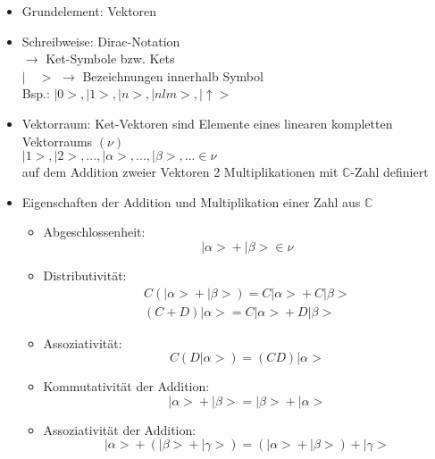 \documentclass[10pt,article,colorback,accentcolor=tud9d]{scrartcl}
\begin{document}
\begin{itemize}
\item Grundelement: Vektoren
\item Schreibweise: Dirac-Notation\\
$\rightarrow$ Ket-Symbole bzw. Kets\\
$\left| \quad > \right.$ $\rightarrow$ Bezeichnungen innerhalb Symbol\\
Bsp.: $\left| 0>\right.,\left|1>\right.,\left|n>\right.,\left|nlm>\right.,\left| \uparrow>\right.$
\item Vektorraum: Ket-Vektoren sind Elemente eines linearen kompletten Vektorraums $(\nu)$\\
$\left|1>\right.,\left|2>\right.,...,\left|\alpha>\right.,...,\left|\beta>\right.,... \in \nu$\\
auf dem Addition zweier Vektoren 2 Multiplikationen mit $\mathbb{C}$-Zahl definiert
\item Eigenschaften der Addition und Multiplikation einer Zahl aus $\mathbb{C}$
\begin{fleqn}
\begin{itemize}
\item Abgeschlossenheit: 
\begin{equation} 
\left| \alpha >\right.+\left|\beta>\right. \in \nu
\end{equation}
\item Distributivität: 
\begin{equation}
\begin{aligned}
C(\left|\alpha>\right. +\left|\beta>\right.) = C\left|\alpha>\right. +C\left|\beta>\right.\\
(C+D)\left|\alpha>\right. = C\left|\alpha>\right. +D\left|\beta>\right.
\end{aligned}
\end{equation}
\item Assoziativität: 
\begin{equation}
C(D\left|\alpha>\right.)=(CD)\left|\alpha>\right.
\end{equation}
\item Kommutativität der Addition: 
\begin{equation}
\left|\alpha>\right. + \left|\beta>\right. =\left|\beta>\right. + \left|\alpha>\right.
\end{equation}
\item Assoziativität der Addition: 
\begin{equation}
\left|\alpha>\right. + (\left|\beta>\right. + \left|\gamma>\right.) = (\left|\alpha>\right. + \left|\beta>\right.)+\left|\gamma>\right.

\end{equation}
\end{itemize}
\end{fleqn}
\end{itemize}
\end{document}
